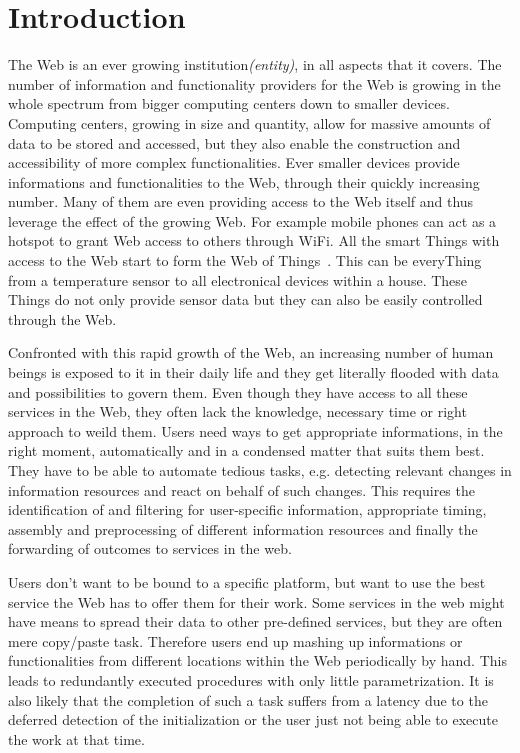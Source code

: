 
\chapter{Introduction}

The Web is an ever growing institution\textit{(entity)}, in all aspects that it covers.
The number of information and functionality providers for the Web is growing in the whole spectrum from bigger computing centers down to smaller devices.
Computing centers, growing in size and quantity, allow for massive amounts of data to be stored and accessed, but they also enable the construction and accessibility of more complex functionalities.
Ever smaller devices provide informations and functionalities to the Web, through their quickly increasing number.
Many of them are even providing access to the Web itself and thus leverage the effect of the growing Web.
For example mobile phones can act as a hotspot to grant Web access to others through \textrm{WiFi}.
All the smart \textrm{Things} with access to the Web start to form the \textrm{Web of Things}~\cite{Guinard2011WoT}.
This can be every\textrm{Thing} from a temperature sensor to all electronical devices within a house.
These \textrm{Things} do not only provide sensor data but they can also be easily controlled through the Web.

Confronted with this rapid growth of the Web, an increasing number of human beings is exposed to it in their daily life and they get literally flooded with data and possibilities to govern them.
Even though they have access to all these services in the Web, they often lack the knowledge, necessary time or right approach to weild them.
Users need ways to get appropriate informations, in the right moment, automatically and in a condensed matter that suits them best.
They have to be able to automate tedious tasks, e.g. detecting relevant changes in information resources and react on behalf of such changes.
This requires the identification of and filtering for user-specific information, appropriate timing, assembly and preprocessing of different information resources and finally the forwarding of outcomes to services in the web. 

Users don't want to be bound to a specific platform, but want to use the best service the Web has to offer them for their work.
Some services in the web might have means to spread their data to other pre-defined services, but they are often mere copy/paste task.
Therefore users end up mashing up informations or functionalities from different locations within the Web periodically by hand.
This leads to redundantly executed procedures with only little parametrization.
It is also likely that the completion of such a task suffers from a latency due to the deferred detection of the initialization or the user just not being able to execute the work at that time.

